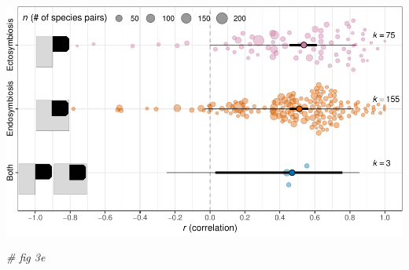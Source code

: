 \documentclass[
]{article}
\newenvironment{Shaded}{\begin{snugshade}}{\end{snugshade}}
\newcommand{\CommentTok}[1]{\textcolor[rgb]{0.56,0.35,0.01}{\textit{#1}}}
\begin{document}
\includegraphics{Supporting_Information_files/figure-latex/unnamed-chunk-31-1.pdf}

\begin{Shaded}
\begin{Highlighting}[]
\CommentTok{# fig 3e}


\end{Highlighting}
\end{Shaded}
\end{document}
